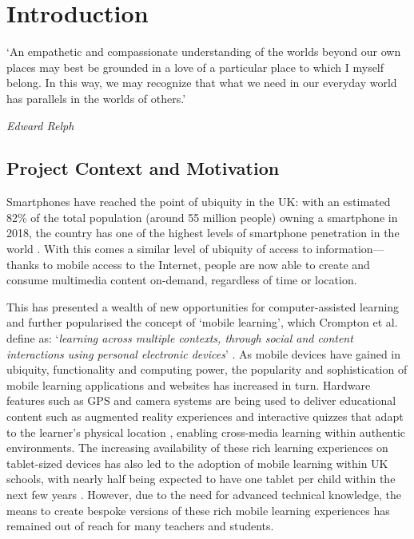 \chapter{Introduction}

\epigraph{`An empathetic and compassionate understanding of the worlds beyond our own places may best be grounded in a love of a particular place to which I myself belong. In this way, we may recognize that what we need in our everyday world has parallels in the worlds of others.'}{\textit{Edward Relph}}

\section{Project Context and Motivation}

Smartphones have reached the point of ubiquity in the UK: with an estimated 82\% of the total population (around 55 million people) owning a smartphone in 2018, the country has one of the highest levels of smartphone penetration in the world \citep{wikipedia2020}. With this comes a similar level of ubiquity of access to information---thanks to mobile access to the Internet, people are now able to create and consume multimedia content on-demand, regardless of time or location.

This has presented a wealth of new opportunities for computer-assisted learning and further popularised the concept of `mobile learning', which Crompton et al. define as: `\textit{learning across multiple contexts, through social and content interactions using personal electronic devices}' \citep{Crompton2013}. As mobile devices have gained in ubiquity, functionality and computing power, the popularity and sophistication of mobile learning applications and websites has increased in turn. Hardware features such as GPS and camera systems are being used to deliver educational content such as augmented reality experiences \citep{google2020} and interactive quizzes that adapt to the learner's physical location \citep{Giemza2013}, enabling cross-media learning within authentic environments. The increasing availability of these rich learning experiences on tablet-sized devices has also led to the adoption of mobile learning within UK schools, with nearly half being expected to have one tablet per child within the next few years \citep{BritishEducationalSuppliersAssociation2015}. However, due to the need for advanced technical knowledge, the means to create bespoke versions of these rich mobile learning experiences has remained out of reach for many teachers and students.

